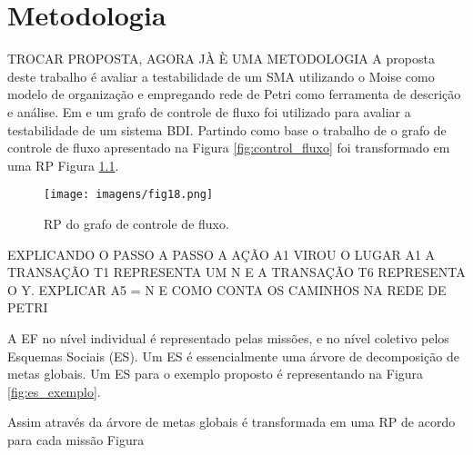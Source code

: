 \chapter{Metodologia}

	
    TROCAR PROPOSTA, AGORA JÀ È UMA METODOLOGIA
    A proposta deste trabalho é avaliar a testabilidade de um SMA utilizando o Moise como modelo de organização e empregando rede de Petri como ferramenta de descrição e análise. Em \cite{winikoff2014testability} e \cite{winikoff2017bdi} um grafo de controle de fluxo foi utilizado para avaliar a testabilidade de um sistema BDI. Partindo como base o trabalho de \cite{winikoff2017bdi} o grafo de controle de fluxo apresentado na Figura \ref{fig:control_fluxo} foi transformado em uma RP Figura \ref{fig:cf_rp}.

\begin{figure}[ht]
\centering
\texttt{[image: imagens/fig18.png]}
\caption{RP do grafo de controle de fluxo.}
\label{fig:cf_rp}
\end{figure}
    
  EXPLICANDO O PASSO A PASSO A AÇÃO A1 VIROU O LUGAR A1 A TRANSAÇÃO T1 REPRESENTA UM N E A TRANSAÇÃO T6 REPRESENTA O Y. EXPLICAR A5 = N E COMO CONTA OS CAMINHOS NA REDE DE PETRI


  

  
  A EF no nível individual é representado pelas missões, e no nível coletivo pelos Esquemas Sociais (ES). Um ES é essencialmente uma árvore de decomposição de metas globais. Um ES para o exemplo proposto é representando na Figura \ref{fig:es_exemplo}.
  






Assim através da árvore de metas globais é transformada em uma RP de acordo para cada missão Figura %


